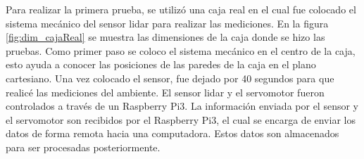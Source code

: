 Para realizar la primera prueba, se utilizó una caja real en el cual fue colocado 
el sistema mecánico del sensor lidar para realizar las mediciones. En la figura 
\ref{fig:dim_cajaReal} se muestra las dimensiones de la caja donde se hizo las 
pruebas. Como primer paso se coloco el sistema mecánico en el centro de la caja, esto
ayuda a conocer las posiciones de las paredes de la caja en el plano cartesiano. Una 
vez colocado el sensor, fue dejado por 40 segundos para que realicé las mediciones del 
ambiente. El sensor lidar y el servomotor fueron controlados a través de un Raspberry 
Pi3. La información enviada por el sensor y el servomotor son recibidos por el Raspberry 
Pi3, el cual se encarga de enviar los datos de forma remota hacia una computadora. Estos 
datos son almacenados para ser procesadas posteriormente.

